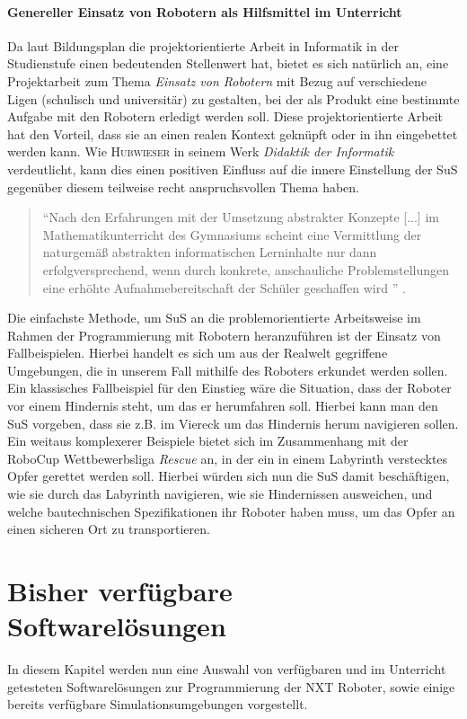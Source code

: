 \documentclass[paper=a4, DIV=14, BCOR=15mm, twoside=on, onecolumn=on, open = right, titlepage =on, parskip =half, headsepline = on, footsepline = on, chapterprefix = on, appendixprefix = off, fontsize = 12pt, numbers = noenddot, abstract = on]{scrbook}
\begin{document}
\subsubsection{Genereller Einsatz von Robotern als Hilfsmittel im Unterricht}
Da laut Bildungsplan die projektorientierte Arbeit in Informatik in der Studienstufe einen bedeutenden Stellenwert hat, bietet es sich natürlich an, eine Projektarbeit zum Thema \emph{Einsatz von Robotern} mit Bezug auf verschiedene Ligen (schulisch und universitär) zu gestalten, bei der als Produkt eine bestimmte Aufgabe mit den Robotern erledigt werden soll.  Diese projektorientierte Arbeit hat den Vorteil, dass sie an einen realen Kontext geknüpft oder in ihn eingebettet werden kann. Wie \textsc{Hubwieser} in seinem Werk \emph{Didaktik der Informatik} verdeutlicht, kann dies einen positiven Einfluss auf die innere Einstellung der SuS gegenüber diesem teilweise recht anspruchsvollen Thema haben.
\begin{quote}
"`Nach den Erfahrungen mit der Umsetzung abstrakter Konzepte [...] im Mathematikunterricht des Gymnasiums scheint eine Vermittlung der naturgemäß abstrakten informatischen Lerninhalte nur dann erfolgversprechend, wenn durch konkrete, anschauliche Problemstellungen eine erhöhte Aufnahmebereitschaft der Schüler geschaffen wird "' \cite[S.68]{hubwieser:07}.
\end{quote}

Die einfachste Methode, um SuS an die problemorientierte Arbeitsweise im Rahmen der Programmierung mit Robotern heranzuführen ist der Einsatz von Fallbeispielen. Hierbei handelt es sich um aus der Realwelt gegriffene Umgebungen, die in unserem Fall mithilfe des Roboters erkundet werden sollen. Ein klassisches Fallbeispiel für den Einstieg wäre die Situation, dass der Roboter vor einem Hindernis steht, um das er herumfahren soll. Hierbei kann man den SuS vorgeben, dass sie z.B. im Viereck um das Hindernis herum navigieren sollen.\\
Ein weitaus komplexerer Beispiele bietet sich im Zusammenhang mit der RoboCup Wettbewerbsliga \emph{Rescue} an, in der ein in einem Labyrinth verstecktes Opfer gerettet werden soll. Hierbei würden sich nun die SuS damit beschäftigen, wie sie durch das Labyrinth navigieren, wie sie Hindernissen ausweichen, und welche bautechnischen Spezifikationen ihr Roboter haben muss, um das Opfer an einen sicheren Ort zu transportieren.

\chapter{Bisher verfügbare Softwarelösungen}
\label{sec:software bisher}
In diesem Kapitel werden nun eine Auswahl von verfügbaren und im Unterricht getesteten Softwarelösungen zur Programmierung der NXT Roboter, sowie einige bereits verfügbare Simulationsumgebungen vorgestellt. 
\end{document}
